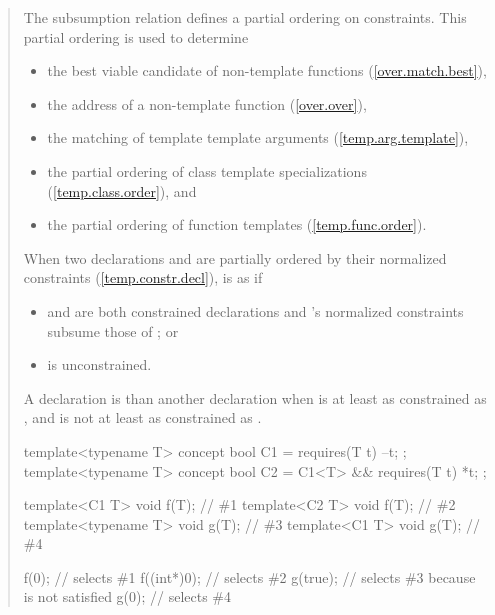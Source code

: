 \begin{quote}
\begin{addedblock}
\pnum
The subsumption relation defines a partial ordering on constraints. 
This partial ordering is used to determine
% 
\begin{itemize}
\item the best viable candidate of non-template functions
     (\ref{over.match.best}), 
\item the address of a non-template function
     (\ref{over.over}), 
\item the matching of template template arguments
     (\ref{temp.arg.template}), 
\item the partial ordering of class template specializations
     (\ref{temp.class.order}), and
\item the partial ordering of function templates
     (\ref{temp.func.order}).
\end{itemize}

\pnum
When two declarations  and  are
partially ordered by their normalized constraints (\ref{temp.constr.decl}), 
 is  as  if
% 
\begin{itemize}
\item {} and  are both constrained declarations and 
's normalized constraints subsume those of ; or

\item {} is unconstrained.
\end{itemize}

\pnum
A declaration  is 
than another declaration  when  is at least as
constrained as , and  is not at least as
constrained as .

\enterexample
\begin{codeblock}
template<typename T> concept bool C1 = requires(T t) { --t; };
template<typename T> concept bool C2 = C1<T> && requires(T t) { *t; };

template<C1 T> void f(T);       // \#1
template<C2 T> void f(T);       // \#2
template<typename T> void g(T); // \#3
template<C1 T> void g(T);       // \#4

f(0);       // selects \#1
f((int*)0); // selects \#2
g(true);    // selects \#3 because  is not satisfied
g(0);       // selects \#4
\end{codeblock}
\exitexample



\end{addedblock}
\end{quote}
